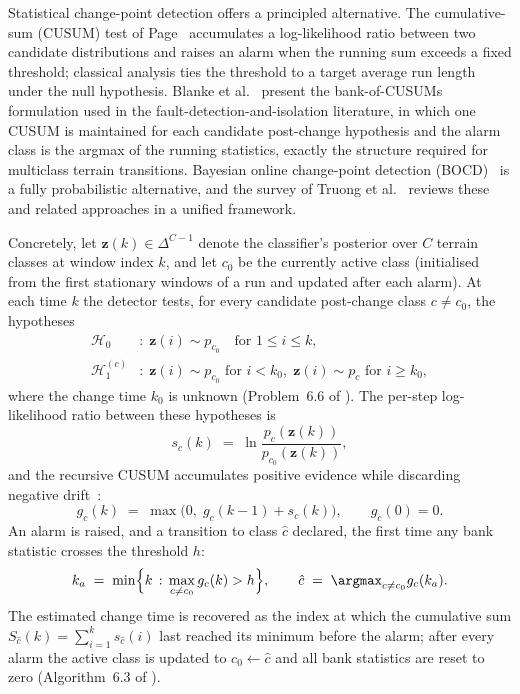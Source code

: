 Statistical change-point detection offers a principled alternative. The cumulative-sum (CUSUM) test of Page~\cite{Page1954} accumulates a log-likelihood ratio between two candidate distributions and raises an alarm when the running sum exceeds a fixed threshold; classical analysis ties the threshold to a target average run length under the null hypothesis. Blanke et al.~\cite[\S6.4]{Blanke2003} present the bank-of-CUSUMs formulation used in the fault-detection-and-isolation literature, in which one CUSUM is maintained for each candidate post-change hypothesis and the alarm class is the argmax of the running statistics, exactly the structure required for multiclass terrain transitions. Bayesian online change-point detection (BOCD)~\cite{Adams2007} is a fully probabilistic alternative, and the survey of Truong et al.~\cite{Truong2020} reviews these and related approaches in a unified framework.

Concretely, let $\mathbf{z}(k) \in \Delta^{C-1}$ denote the classifier's posterior over $C$ terrain classes at window index $k$, and let $c_{0}$ be the currently active class (initialised from the first stationary windows of a run and updated after each alarm). At each time $k$ the detector tests, for every candidate post-change class $c \neq c_{0}$, the hypotheses
\begin{align}
  \mathcal{H}_0       &:\; \mathbf{z}(i) \sim p_{c_0}
                          \quad \text{for } 1 \le i \le k, \\
  \mathcal{H}_1^{(c)} &:\; \mathbf{z}(i) \sim p_{c_0}
                          \text{ for } i < k_0, \;
                          \mathbf{z}(i) \sim p_{c}
                          \text{ for } i \ge k_0,
\end{align}
where the change time $k_0$ is unknown (Problem~6.6 of \cite{Blanke2003}). The per-step log-likelihood ratio between these hypotheses is
\begin{equation}
    s_{c}(k) \;=\; \ln \frac{p_{c}(\mathbf{z}(k))}{p_{c_{0}}(\mathbf{z}(k))},
    \label{eq:cusum-llr}
\end{equation} and the recursive CUSUM accumulates positive evidence while discarding negative drift~\cite[\S6.4.2]{Blanke2003}:
\begin{equation}
    g_{c}(k) \;=\; \max\!\bigl(0,\;g_{c}(k-1) + s_{c}(k)\bigr),
    \qquad g_{c}(0) = 0.
    \label{eq:cusum-recursion}
\end{equation}
An alarm is raised, and a transition to class $\hat{c}$ declared, the first time any bank statistic crosses the threshold $h$:
\begin{equation}
    k_{a} \;=\; \min\Bigl\{ k \,:\, \max_{c \neq c_{0}} g_{c}(k) > h \Bigr\},
    \qquad
    \hat{c} \;=\; \argmax_{c \neq c_{0}} g_{c}(k_{a}).
    \label{eq:cusum-alarm}
\end{equation}
The estimated change time is recovered as the index at which the cumulative sum $S_{\hat{c}}(k) = \sum_{i=1}^{k} s_{\hat{c}}(i)$ last reached its minimum before the alarm; after every alarm the active class is updated to $c_0 \leftarrow \hat{c}$ and all bank statistics are reset to zero (Algorithm~6.3 of \cite{Blanke2003}).

